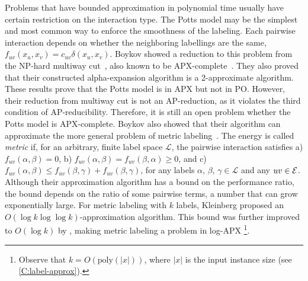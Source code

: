 Problems that have bounded approximation in polynomial time usually have certain restriction on the interaction type. The Potts model may be the simplest and most common way to enforce the smoothness of the labeling. Each pairwise interaction depends on whether the neighboring labellings are the same, \ie $f_{uv}(x_u,x_v) = c_{uv}\delta(x_u, x_v)$.  Boykov \etal showed a reduction to this problem from the NP-hard multiway cut~\cite{boykov2001approximate}, also known to be APX-complete~\cite{ausiello1999complexity, dahlhaus1994complexity}. They also proved that their constructed alpha-expansion algorithm is a 2-approximate algorithm. These results prove that the Potts model is in APX but not in PO. However, their reduction from multiway cut is not an AP-reduction, as it violates the third condition of AP-reducibility. Therefore, it is still an open problem whether the Potts model is APX-complete.
Boykov \etal also showed that their algorithm can approximate the more general problem of metric labeling~\cite{boykov2001approximate}. The energy is called {\em metric} if, for an arbitrary, finite label space $\mathcal{L}$, the pairwise interaction satisfies a) $ f_{uv}(\alpha, \beta) = 0$, b) $f_{uv}(\alpha, \beta) = f_{uv}(\beta, \alpha) \geq 0$, and c) $f_{uv}(\alpha, \beta) \leq f_{uv}(\beta, \gamma) + f_{uv}(\beta, \gamma)$,
for any labels $\alpha$, $\beta$, $\gamma \in \mathcal{L}$ and any $uv \in \mathcal{E}$. Although their approximation algorithm has a bound on the performance ratio, the bound depends on the ratio of some pairwise terms, a number that can grow exponentially large. For metric labeling with $k$ labels, Kleinberg \etal proposed an $O(\log k \log \log k)$-approximation algorithm. This bound was further improved to $O(\log k)$ by \citet{Chekuri:2005:LPF}, making metric labeling a problem in log-APX \footnote{Observe that $k = O(\text{poly}(|x|))$, where $|x|$ is the input instance size (see \cref{C:label-approx}). }.

